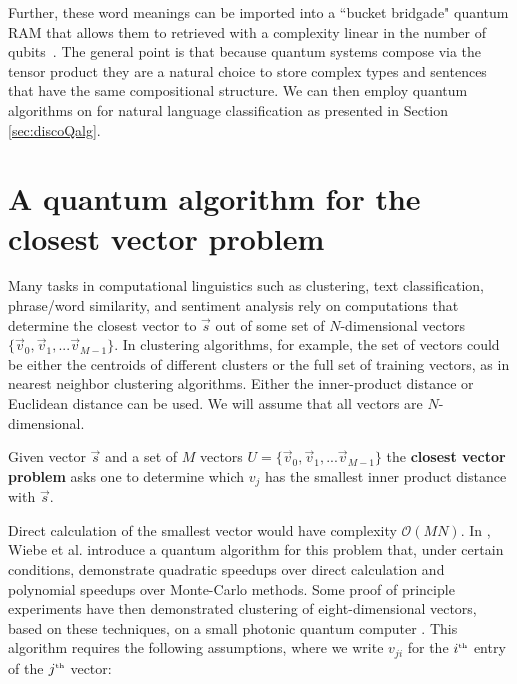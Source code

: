 Further, these word meanings can be imported into a ``bucket bridgade" quantum RAM that allows them to retrieved with a complexity linear in the number of qubits~\cite{giovannetti2008quantum}. The general point is that because quantum systems compose via the tensor product they are a natural choice to store complex types and sentences that have the same compositional structure. We can then employ quantum algorithms on for natural language classification as presented in Section \ref{sec:discoQalg}.

\section{A quantum algorithm for the closest vector problem}
\label{sec:qalg}

Many tasks in computational linguistics such as clustering, text classification, phrase/word similarity, and sentiment analysis rely on computations that determine the closest vector to $\vec{s}$ out of some set of $N$-dimensional vectors $\{\vec{v}_0,\vec{v}_1,...\vec{v}_{M-1}\}$. In clustering algorithms, for example, the set of vectors could be either the centroids of different clusters or the full set of training vectors, as in nearest neighbor clustering algorithms. Either the inner-product distance or Euclidean distance can be used. We will assume that all vectors are $N$-dimensional.
\begin{defn}
Given vector $\vec{s}$ and a set of $M$ vectors $U = \{\vec{v}_0,\vec{v}_1,...\vec{v}_{M-1}\}$ the \textbf{closest vector problem} asks one to determine which $v_j$ has the smallest inner product distance with $\vec{s}$.
\end{defn}
Direct calculation of the smallest vector would have complexity $\mathcal{O}(MN)$.  In \cite{wiebe2014quantum}, Wiebe et al. introduce a quantum algorithm for this problem that, under certain conditions, demonstrate quadratic speedups over direct calculation and polynomial speedups over Monte-Carlo methods. Some proof of principle experiments have then demonstrated clustering of eight-dimensional vectors, based on these techniques, on a small photonic quantum computer \cite{cai2015entanglement}. This algorithm requires the following assumptions, where we write $v_{ji}$ for the $i^{\tiny\mbox{th}}$ entry of the $j^{\tiny\mbox{th}}$ vector:
